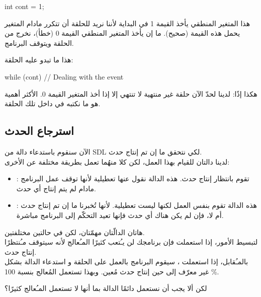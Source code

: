 \begin{Csource}
int cont = 1;
\end{Csource}

هذا المتغير المنطقي يأخذ القيمة 1 في البداية لأننا نريد للحلقة أن تتكرر مادام المتغير
يحمل هذه القيمة (صحيح). ما إن يأخذ المتغير المنطقي القيمة 0 (خطأ)، نخرج من الحلقة ويتوقف البرنامج.

هذا ما تبدو عليه الحلقة:

\begin{Csource}
while (cont)
{
	// Dealing with the event
}
\end{Csource}

هكذا إذًا: لدينا لحدّ الآن حلقة غير منتهية لا تنتهي إلا إذا أخذ المتغير 
القيمة 0. الأكثر أهمية هو ما نكتبه في داخل تلك الحلقة.

\subsection{استرجاع الحدث}

الآن سنقوم باستدعاء دالة من \textenglish{SDL}
لكي نتحقق ما إن تم إنتاج حدث.\\
لدينا دالتان للقيام بهذا العمل، لكن كلا منهُما تعمل بطريقة مختلفة عن الأخرى:

\begin{itemize}
	\item {}:
	تقوم بانتظار إنتاج حدث. هذه الدالة نقول عنها تعطيلية لأنها توقف عمل البرنامج مادام لم يتم إنتاج أي حدث.
	\item {}:
	هذه الدالة تقوم بنفس العمل لكنها ليست تعطيلية. لأنها تُخبرنا ما إن تم إنتاج حدث أم لا، فإن لم يكن هناك أي حدث فإنها تعيد التحكّم إلى البرنامج مباشرة.
\end{itemize}

هاتان الدالّتان مهمّتان، لكن في حالتين مختلفتين.\\
لتبسيط الأمور، إذا استعملت 
فإن برنامجك لن يـُتعب كثيرًا المـُعالج لأنه سيتوقف مـُنتظرًا إنتاج حدث.\\
بالمـُقابل، إذا استعملت 
،
سيقوم البرنامج بالعمل على الحلقة
و استدعاء الدالة 
بشكل غير معرّف إلى حين إنتاج حدث مُعين. وبهذا تستعمل المُعالج  بنسبة 100
\%.

\begin{question}
لكن ألا يجب أن نستعمل دائمًا الدالة 
بما أنها لا تستعمل المـُعالج كثيرًا؟
\end{question}

